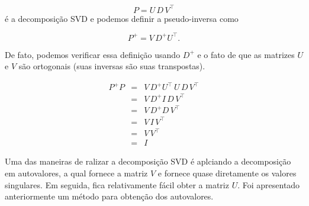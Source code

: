 \begin{equation*}
P=U\,D\,V^\top
\end{equation*}
é a decomposição SVD e podemos definir a pseudo-inversa como

\begin{equation*}
P^+=V\,D^+U^\top.
\end{equation*}

De fato, podemos verificar essa definição usando $D^+$ e o fato de que as matrizes $U$ e $V$ são ortogonais (suas inversas são suas transpostas).

\begin{equation*}
\begin{array}{rcl}
P^+P&=&V\,D^+U^\top\,U\,D\,V^\top\\
&=&V\,D^+I\,D\,V^\top\\
&=&V\,D^+D\,V^\top\\
&=&V\,I\,V^\top\\
&=&V\,V^\top\\
&=&I
\end{array}
\end{equation*}

Uma das maneiras de ralizar a decomposição SVD é aplciando a decomposição em autovalores, a qual fornece a matriz $V$ e fornece quase diretamente os valores singulares. Em seguida, fica relativamente fácil obter a matriz $U$. Foi apresentado anteriormente um método para obtenção dos autovalores.


